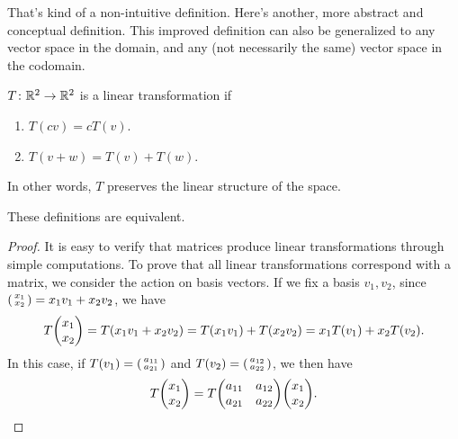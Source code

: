 That's kind of a non-intuitive definition. Here's another, more abstract and conceptual definition. This improved definition can also be generalized to any vector space in the domain, and any (not necessarily the same) vector space in the codomain. 

\begin{definition}
    $T \colon \mathbb R^2 \to \mathbb R^2$ is a linear transformation if \begin{enumerate}
        \item $T(cv) = cT(v)$.
        \item $T(v + w) = T(v) + T(w)$.
    \end{enumerate}
    In other words, $T$ preserves the linear structure of the space.
\end{definition}

\begin{proposition}
    These definitions are equivalent.
\end{proposition}

\begin{proof}
    It is easy to verify that matrices produce linear transformations through simple computations. To prove that all linear transformations correspond with a matrix, we consider the action on basis vectors. If we fix a basis $v_1, v_2$, since $\smqty(x_1\\ x_2) = x_1v_1 + x_2v_2$, we have \[T\mqty(x_1\\ x_2) = T(x_1v_1 + x_2v_2) = T(x_1v_1) + T(x_2v_2) = x_1T(v_1) + x_2T(v_2).\] In this case, if $T(v_1) = \smqty(a_{11} \\ a_{21})$ and $T(v_2) = \smqty(a_{12} \\ a_{22})$, we then have \[T\mqty(x_1 \\ x_2) = T\mqty(a_{11} & a_{12} \\ a_{21} & a_{22})\mqty(x_1 \\ x_2).\]
\end{proof}

